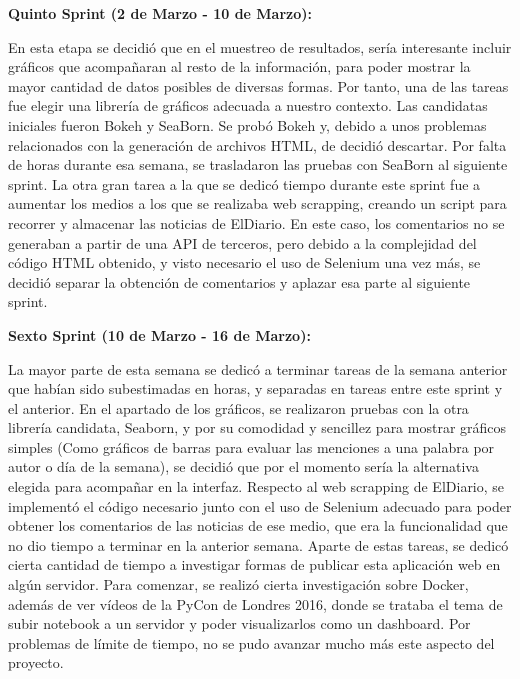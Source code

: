 

\textbf{Quinto Sprint (2 de Marzo - 10 de Marzo):}

En esta etapa se decidió que en el muestreo de resultados, sería interesante incluir gráficos que acompañaran al resto de la información, para poder mostrar la mayor cantidad de datos posibles de diversas formas. Por tanto, una de las tareas fue elegir una librería de gráficos adecuada a nuestro contexto. 
Las candidatas iniciales fueron Bokeh y SeaBorn. Se probó Bokeh y, debido a unos problemas relacionados con la generación de archivos HTML, de decidió descartar. Por falta de horas durante esa semana, se trasladaron las pruebas con SeaBorn al siguiente sprint.
La otra gran tarea a la que se dedicó tiempo durante este sprint fue a aumentar los medios a los que se realizaba web scrapping, creando un script para recorrer y almacenar las noticias de ElDiario. En este caso, los comentarios no se generaban a partir de una API de terceros, pero debido a la complejidad del código HTML obtenido, y visto necesario el uso de Selenium una vez más, se decidió separar la obtención de comentarios y aplazar esa parte al siguiente sprint.



\textbf{Sexto Sprint (10 de Marzo - 16 de Marzo):}

La mayor parte de esta semana se dedicó a terminar tareas de la semana anterior que habían sido subestimadas en horas, y separadas en tareas entre este sprint y el anterior.
En el apartado de los gráficos, se realizaron pruebas con la otra librería candidata, Seaborn, y por su comodidad y sencillez para mostrar gráficos simples (Como gráficos de barras para evaluar las menciones a una palabra por autor o día de la semana), se decidió que por el momento sería la alternativa elegida para acompañar en la interfaz.
Respecto al web scrapping de ElDiario, se implementó el código necesario junto con el uso de Selenium adecuado para poder obtener los comentarios de las noticias de ese medio, que era la funcionalidad que no dio tiempo a terminar en la anterior semana.
Aparte de estas tareas, se dedicó cierta cantidad de tiempo a investigar formas de publicar esta aplicación web en algún servidor. Para comenzar, se realizó cierta investigación sobre Docker, además de ver vídeos de la PyCon de Londres 2016, donde se trataba el tema de subir notebook a un servidor y poder visualizarlos como un dashboard. Por problemas de límite de tiempo, no se pudo avanzar mucho más este aspecto del proyecto.

